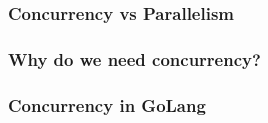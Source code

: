 \subsubsection{Concurrency vs Parallelism}
\label{subs:Concurrency vs Parallism}


\subsubsection{Why do we need concurrency?}
\label{subs:Why do we need parallism}


\subsubsection{Concurrency in GoLang}
\label{subs:Concurrency in GoLang}

